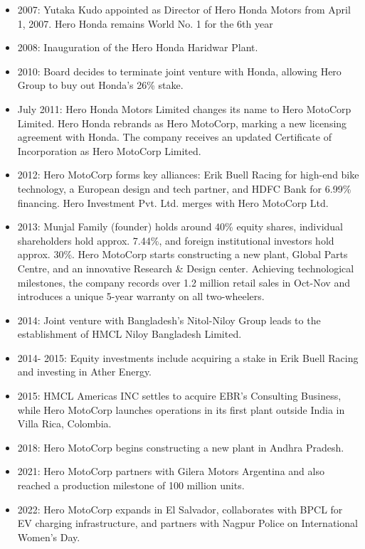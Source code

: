 \begin{itemize}
	\item 2007:
	Yutaka Kudo appointed as Director of Hero Honda Motors from April 1, 2007. Hero Honda remains World No. 1 for the 6th year
	
	\item 2008:
	Inauguration of the Hero Honda Haridwar Plant.
	
	\item 2010:
	Board decides to terminate joint venture with Honda, allowing Hero Group to buy out Honda's 26\% stake.
	
	\item July 2011:
	Hero Honda Motors Limited changes its name to Hero MotoCorp Limited. Hero Honda rebrands as Hero MotoCorp, marking a new licensing agreement with Honda. The company receives an updated Certificate of Incorporation as Hero MotoCorp Limited.
	
	\item 2012:
	Hero MotoCorp forms key alliances: Erik Buell Racing for high-end bike technology, a European design and tech partner, and HDFC Bank for 6.99\% financing. Hero Investment Pvt. Ltd. merges with Hero MotoCorp Ltd.
	
	\item 2013:
	Munjal Family (founder) holds around 40\% equity shares, individual shareholders hold approx. 7.44\%, and foreign institutional investors hold approx. 30\%.
	Hero MotoCorp starts constructing a new plant, Global Parts Centre, and an innovative Research \& Design center. Achieving technological milestones, the company records over 1.2 million retail sales in Oct-Nov and introduces a unique 5-year warranty on all two-wheelers.
	
	\item 2014:
	Joint venture with Bangladesh's Nitol-Niloy Group leads to the establishment of HMCL Niloy Bangladesh Limited.
	
	\item 2014- 2015:
	Equity investments include acquiring a stake in Erik Buell Racing and investing in Ather Energy.
	
	\item 2015:
	HMCL Americas INC settles to acquire EBR's Consulting Business, while Hero MotoCorp launches operations in its first plant outside India in Villa Rica, Colombia.
	
	\item 2018:
	Hero MotoCorp begins constructing a new plant in Andhra Pradesh.
	
	\item 2021:
	Hero MotoCorp partners with Gilera Motors Argentina and also reached a production milestone of 100 million units.
	
	\item 2022:
	Hero MotoCorp expands in El Salvador, collaborates with BPCL for EV charging infrastructure, and partners with Nagpur Police on International Women's Day.
\end{itemize}